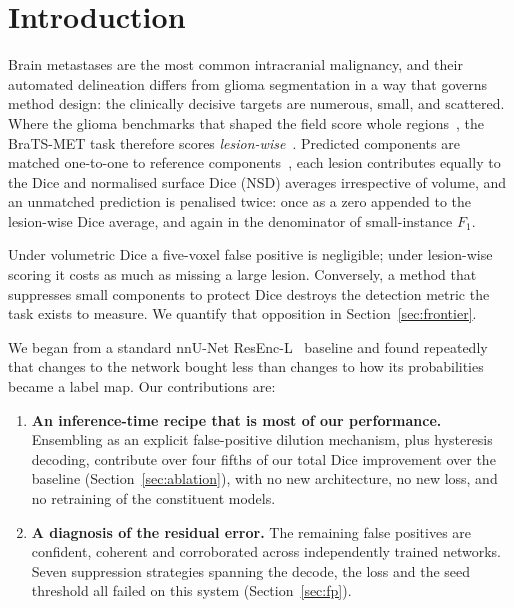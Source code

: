 \documentclass[runningheads]{llncs}
\begin{document}
\section{Introduction}
\label{sec:intro}

Brain metastases are the most common intracranial malignancy, and their automated delineation
differs from glioma segmentation in a way that governs method design: the clinically decisive
targets are numerous, small, and scattered. Where the glioma benchmarks that shaped the field
score whole regions~\cite{baid2021}, the BraTS-MET task therefore scores
\emph{lesion-wise}~\cite{bratsmet2023}. Predicted components are matched one-to-one to reference
components~\cite{grosskopf2026matching}, each lesion contributes equally to the Dice and normalised surface Dice (NSD)
averages irrespective of volume, and an unmatched prediction is penalised twice: once as a zero
appended to the lesion-wise Dice average, and again in the denominator of small-instance $F_1$.

Under volumetric Dice a five-voxel false positive is negligible; under lesion-wise scoring it
costs as much as missing a large lesion. Conversely, a method that suppresses small components to
protect Dice destroys the detection metric the task exists to measure. We quantify that
opposition in Section~\ref{sec:frontier}.

We began from a standard nnU-Net ResEnc-L~\cite{isensee2021nnunet,isensee2024resenc} baseline and
found repeatedly that changes to the network bought less than changes to how its probabilities
became a label map. Our contributions are:

\begin{enumerate}
\item \textbf{An inference-time recipe that is most of our performance.} Ensembling as an
      explicit false-positive dilution mechanism, plus hysteresis decoding, contribute over
      four fifths of our total Dice improvement over the baseline
      (Section~\ref{sec:ablation}), with no new architecture, no new loss, and no retraining of
      the constituent models.
\item \textbf{A diagnosis of the residual error.} The remaining false positives are confident,
      coherent and corroborated across independently trained networks. Seven suppression
      strategies spanning the decode, the loss and the seed threshold all failed on this system
      (Section~\ref{sec:fp}).
\end{enumerate}
\end{document}
